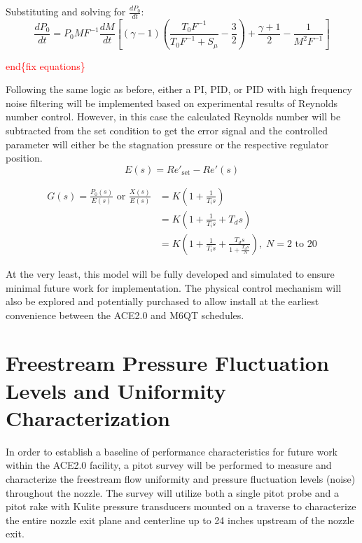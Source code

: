 \noindent Substituting and solving for $\frac{dP_0}{dt}$:
\begin{equation}
    \frac{dP_0}{dt} = P_0 M F^{-1} \frac{dM}{dt} \left[ (\gamma-1) \left( \frac{T_0 F^{-1}}{T_0 F^{-1} + S_\mu} - \frac{3}{2} \right) + \frac{\gamma+1}{2} - \frac{1}{M^2 F^{-1}} \right]
\end{equation}

\textcolor{red}{end\{fix equations\}}

Following the same logic as before, either a PI, PID, or PID with high frequency noise filtering will be implemented based on experimental results of Reynolds number control. However, in this case the calculated Reynolds number will be subtracted from the set condition to get the error signal and the controlled parameter will either be the stagnation pressure or the respective regulator position.
\begin{equation}
    E(s) = Re'_{\mathrm{set}} - Re'(s)
\end{equation}

\vspace{-1.5cm}
\begin{subequations}
    \begin{align}
        G(s) = \frac{P_0(s)}{E(s)} \textrm{ or } \frac{X(s)}{E(s)} &= K \left(1 + \frac{1}{T_i s}\right) \label{eq:Re-PI}\\
                                 &= K \left(1 + \frac{1}{T_i s} + T_d s\right) \label{eq:Re-PID}\\
                                 &= K \left(1 + \frac{1}{T_i s} + \frac{T_d s}{1+\frac{T_d s}{N}}\right), \; N=2\textrm{ to }20 \label{eq:Re-PID-filter}
    \end{align}
\end{subequations}

At the very least, this model will be fully developed and simulated to ensure minimal future work for implementation. The physical control mechanism will also be explored and potentially purchased to allow install at the earliest convenience between the ACE2.0 and M6QT schedules.

\section{Freestream Pressure Fluctuation Levels and Uniformity Characterization}

In order to establish a baseline of performance characteristics for future work within the ACE2.0 facility, a pitot survey will be performed to measure and characterize the freestream flow uniformity and pressure fluctuation levels (noise) throughout the nozzle. The survey will utilize both a single pitot probe and a pitot rake with Kulite pressure transducers mounted on a traverse to characterize the entire nozzle exit plane and centerline up to 24 inches upstream of the nozzle exit.


